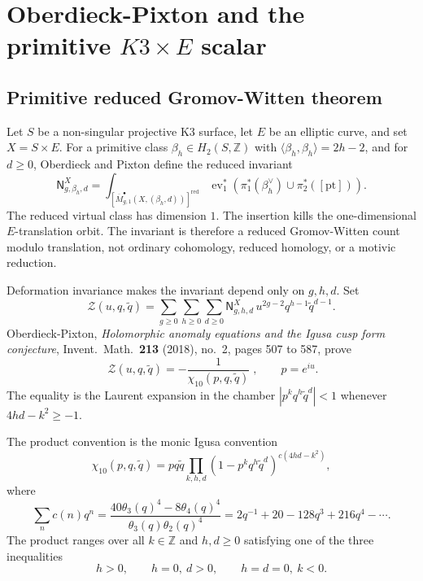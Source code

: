 \providecommand{\kBKM}{\kappa_{\mathrm{BKM}}}
\providecommand{\kch}{\kappa_{\mathrm{ch}}}
\providecommand{\kcat}{\kappa_{\mathrm{cat}}}
\providecommand{\Mbar}{\overline{M}}
\providecommand{\Nred}{\mathsf{N}}
\providecommand{\Zred}{\mathcal{Z}}
\providecommand{\PhiOP}{\Phi_{10}^{\mathrm{OP}}}
\providecommand{\Phiun}{\Phi_{10}^{\mathrm{un}}}
\providecommand{\DeltaFive}{\Delta_5}
\providecommand{\DFive}{D_5}

\section*{Oberdieck-Pixton and the primitive \texorpdfstring{$K3\times E$}{K3 x E} scalar}

\subsection*{Primitive reduced Gromov-Witten theorem}

Let $S$ be a non-singular projective K3 surface, let $E$ be an elliptic
curve, and set $X=S\times E$.  For a primitive class
$\beta_h\in H_2(S,\mathbb Z)$ with
$\langle\beta_h,\beta_h\rangle=2h-2$, and for $d\geq0$, Oberdieck and
Pixton define the reduced invariant
\[
  \Nred_{g,\beta_h,d}^{X}
  =
  \int_{{\left[\Mbar_{g,1}^{\bullet}(X,(\beta_h,d))\right]}^{\mathrm{red}}}
  \operatorname{ev}_1^*\!\left(\pi_1^*(\beta_h^\vee)\cup
  \pi_2^*([\mathrm{pt}])\right).
\]
The reduced virtual class has dimension $1$.  The insertion kills the
one-dimensional $E$-translation orbit.  The invariant is therefore a
reduced Gromov-Witten count modulo translation, not ordinary
cohomology, reduced homology, or a motivic reduction.

Deformation invariance makes the invariant depend only on $g,h,d$.
Set
\[
  \Zred(u,q,\tilde q)
  =
  \sum_{g\geq0}\sum_{h\geq0}\sum_{d\geq0}
  \Nred_{g,h,d}^{X}\,u^{2g-2}q^{h-1}\tilde q^{d-1}.
\]
Oberdieck-Pixton, \emph{Holomorphic anomaly equations and the Igusa
cusp form conjecture}, Invent.\ Math.\ \textbf{213} (2018), no.~2,
pages 507 to 587, prove
\[
  \boxed{\;\Zred(u,q,\tilde q)
  =
  -\frac{1}{\chi_{10}(p,q,\tilde q)}\;,\qquad p=e^{iu}.}
\]
The equality is the Laurent expansion in the chamber
$|p^{k}q^{h}\tilde q^{d}|<1$ whenever $4hd-k^2\geq -1$.

The product convention is the monic Igusa convention
\[
  \chi_{10}(p,q,\tilde q)
  =
  pq\tilde q
  \prod_{k,h,d}
  {(1-p^{k}q^{h}\tilde q^{d})}^{c(4hd-k^2)},
\]
where
\[
  \sum_n c(n)q^n
  =
  \frac{40{\theta_3(q)}^4-8{\theta_4(q)}^4}
       {\theta_3(q){\theta_2(q)}^4}
  =
  2q^{-1}+20-128q^3+216q^4-\cdots .
\]
The product ranges over all $k\in\mathbb Z$ and $h,d\geq0$ satisfying
one of the three inequalities
\[
  h>0,\qquad
  h=0,\ d>0,\qquad
  h=d=0,\ k<0.
\]

